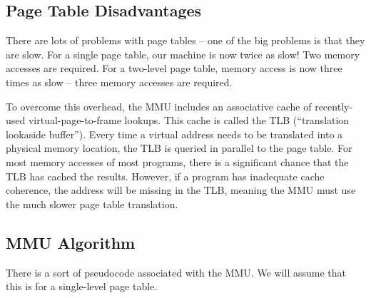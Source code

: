\subsection{Page Table Disadvantages}
	 
There are lots of problems with page tables -- one of the big problems is that they are slow.
For a single page table, our machine is now twice as slow!
Two memory accesses are required.
For a two-level page table, memory access is now three times as slow -- three memory accesses are required.
	 
To overcome this overhead, the MMU includes an associative cache of recently-used virtual-page-to-frame lookups.
This cache is called the TLB (``translation lookaside buffer'').
Every time a virtual address needs to be translated into a physical memory location, the TLB is queried in parallel to the page table.
For most memory accesses of most programs, there is a significant chance that the TLB has cached the results.
However, if a program has inadequate cache coherence, the address will be missing in the TLB, meaning the MMU must use the much slower page table translation.
	 
\subsection{MMU Algorithm}
	 
There is a sort of pseudocode associated with the MMU.
We will assume that this is for a single-level page table.
	 
